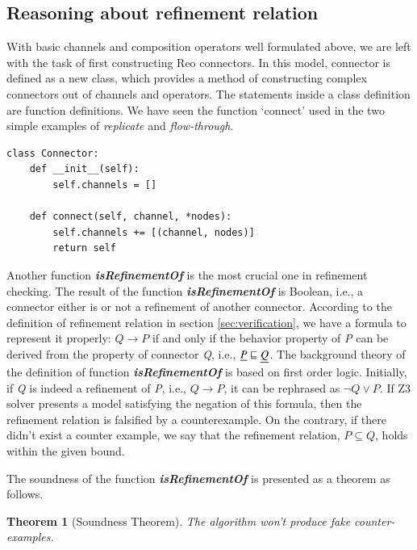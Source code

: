 \documentclass[3p,times]{elsarticle}
\newtheorem{theorem}{Theorem}[section]
\begin{document}
\subsection{Reasoning about refinement relation}
With basic channels and composition operators well formulated above, we are left with the task of first constructing Reo connectors. In this model, connector is defined as a new class, which provides a method of constructing complex connectors out of channels and operators.
The statements inside a class definition are function definitions. We have seen the function `connect' used in the two simple examples of \emph{replicate} and \emph{flow-through}.
\begin{lstlisting}[frame=single]
class Connector:
    def __init__(self):
        self.channels = []

    def connect(self, channel, *nodes):
        self.channels += [(channel, nodes)]
        return self
\end{lstlisting}
Another function \textbf{\emph{isRefinementOf}} is the most crucial one in refinement checking. The result of the function \textbf{\emph{isRefinementOf}} is Boolean, i.e., a connector either is or not a refinement of another connector. According to the definition of refinement relation in section \ref{sec:verification}, we have a formula to represent it properly: $Q \rightarrow P$ if and only if the behavior property of \emph{P} can be derived from the property of connector \emph{Q}, i.e., $\emph{P} \sqsubseteq \emph{Q}$. The background theory of the definition of function  \textbf{\emph{isRefinementOf}} is based on first order logic. Initially, if \emph{Q} is indeed a refinement of \emph{P}, i.e., $Q \rightarrow P$, it can be rephrased as $\neg Q \vee P$. If Z3 solver presents a model satisfying the negation of this formula, then the refinement relation is falsified by a counterexample. On the contrary, if there didn't exist a counter example, we say that the refinement relation, $P\subseteq Q$, holds within the given bound.

The soundness of the function \textbf{\emph{isRefinementOf}} is presented as a theorem as follows.
\begin{theorem}[Soundness Theorem]
The algorithm won't produce fake counter-examples.
\end{theorem}
\end{document}
